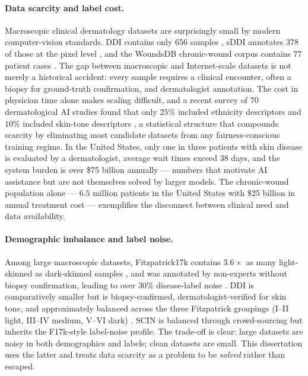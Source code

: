\documentclass[11pt]{ucthesis}
\begin{document}
\paragraph{Data scarcity and label cost.}
Macroscopic clinical dermatology datasets are surprisingly small by modern computer-vision standards. DDI contains only $656$ samples \cite{daneshjou_2022_disparities}, sDDI annotates $378$ of those at the pixel level \cite{carrion-2023}, and the WoundsDB chronic-wound corpus contains $77$ patient cases \cite{juszczyk-2020}. The gap between macroscopic and Internet-scale datasets is not merely a historical accident: every sample requires a clinical encounter, often a biopsy for ground-truth confirmation, and dermatologist annotation. The cost in physician time alone makes scaling difficult, and a recent survey of $70$ dermatological AI studies found that only $25\%$ included ethnicity descriptors and $10\%$ included skin-tone descriptors \cite{daneshjou_2021_lack}, a statistical structure that compounds scarcity by eliminating most candidate datasets from any fairness-conscious training regime. In the United States, only one in three patients with skin disease is evaluated by a dermatologist, average wait times exceed $38$ days, and the system burden is over \$$75$ billion annually \cite{tsang_2006_even,a2016_burden} --- numbers that motivate AI assistance but are not themselves solved by larger models. The chronic-wound population alone --- $6.5$ million patients in the United States with $\$25$ billion in annual treatment cost \cite{sen2009human,steiner2020surgeries} --- exemplifies the disconnect between clinical need and data availability.

\paragraph{Demographic imbalance and label noise.}
Among large macroscopic datasets, Fitzpatrick17k contains $3.6\times$ as many light-skinned as dark-skinned samples \cite{groh_2021_evaluating}, and was annotated by non-experts without biopsy confirmation, leading to over $30\%$ disease-label noise \cite{groh_2021_evaluating,daneshjou_2022_checklist}. DDI is comparatively smaller but is biopsy-confirmed, dermatologist-verified for skin tone, and approximately balanced across the three Fitzpatrick groupings (I--II light, III--IV medium, V--VI dark) \cite{daneshjou_2022_disparities,fitzpatrick_1988_the}. SCIN \cite{Jeong6186} is balanced through crowd-sourcing but inherits the F17k-style label-noise profile. The trade-off is clear: large datasets are noisy in both demographics and labels; clean datasets are small. This dissertation uses the latter and treats data scarcity as a problem to be \emph{solved} rather than escaped.
\end{document}
